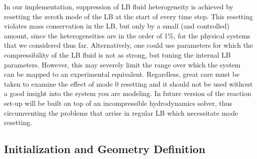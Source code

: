 In our implementation, suppression of LB fluid heterogeneity is achieved by 
resetting the zeroth mode of the LB at the start of every time step. This 
resetting violates mass conservation in the LB, but only by a small (and 
controlled) amount, since the heterogeneities are in the order of 1\%, 
for the physical systems that we considered thus far. Alternatively, one could
use parameters for which the compressibility of the LB fluid is not as strong, 
but tuning the internal LB parameters. However, this may severely limit the 
range over which the system can be mapped to an experimental equivalent. 
Regardless, great care must be taken to examine the effect of mode 0 resetting 
and it should not be used without a good insight into the system you are 
modeling. In future version of \es{} the reaction set-up will be built on top of
an incompressible hydrodynamics solver, thus circumventing the problems that
arrise in regular LB which necessitate mode resetting.

\subsection{\label{ssec:ek-reac-init}Initialization and Geometry Definition}

